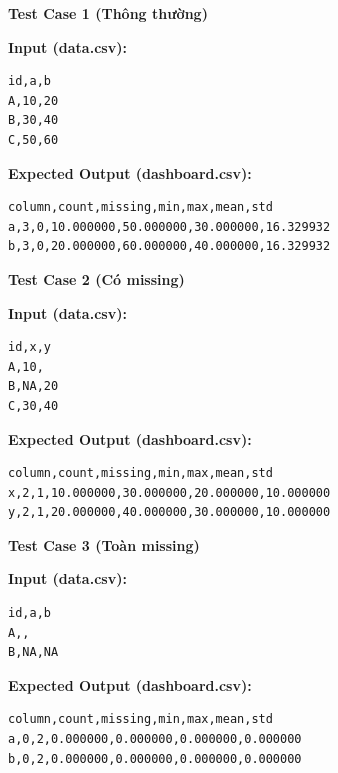 \textbf{Test Case 1 (Thông thường)}

\textbf{Input (data.csv):}

\begin{lstlisting}
id,a,b
A,10,20
B,30,40
C,50,60
\end{lstlisting}

\textbf{Expected Output (dashboard.csv):}

\begin{lstlisting}
column,count,missing,min,max,mean,std
a,3,0,10.000000,50.000000,30.000000,16.329932
b,3,0,20.000000,60.000000,40.000000,16.329932
\end{lstlisting}

\vspace{0.5cm}

\textbf{Test Case 2 (Có missing)}

\textbf{Input (data.csv):}

\begin{lstlisting}
id,x,y
A,10,
B,NA,20
C,30,40
\end{lstlisting}

\textbf{Expected Output (dashboard.csv):}

\begin{lstlisting}
column,count,missing,min,max,mean,std
x,2,1,10.000000,30.000000,20.000000,10.000000
y,2,1,20.000000,40.000000,30.000000,10.000000
\end{lstlisting}

\vspace{0.5cm}

\textbf{Test Case 3 (Toàn missing)}

\textbf{Input (data.csv):}

\begin{lstlisting}
id,a,b
A,,
B,NA,NA
\end{lstlisting}

\textbf{Expected Output (dashboard.csv):}

\begin{lstlisting}
column,count,missing,min,max,mean,std
a,0,2,0.000000,0.000000,0.000000,0.000000
b,0,2,0.000000,0.000000,0.000000,0.000000
\end{lstlisting}